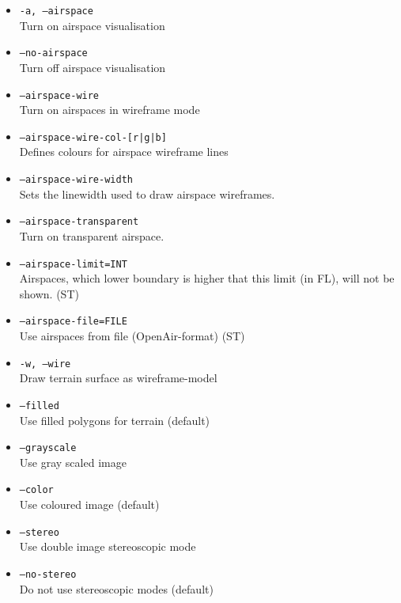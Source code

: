 \begin{itemize}
\item \texttt{-a, --airspace} \\
Turn on airspace visualisation

\item \texttt{--no-airspace} \\
Turn off airspace visualisation

\item \texttt{--airspace-wire} \\
Turn on airspaces in wireframe mode

\item \texttt{--airspace-wire-col-[r|g|b]} \\
Defines colours for airspace wireframe lines

\item \texttt{--airspace-wire-width}\\
Sets the linewidth used to draw airspace wireframes.

\item \texttt{--airspace-transparent} \\
Turn on transparent airspace.

\item \texttt{--airspace-limit=INT} \\
Airspaces, which lower boundary is higher that this limit (in FL), will not be shown. (ST)

\item \texttt{--airspace-file=FILE} \\
Use airspaces from file (OpenAir\texttrademark -format) (ST)

\item \texttt{-w, --wire} \\
Draw terrain surface as wireframe-model

\item \texttt{--filled} \\
Use filled polygons for terrain (default)

\item \texttt{--grayscale} \\
Use gray scaled image

\item \texttt{--color} \\
Use coloured image (default)

\item \texttt{--stereo} \\
Use double image stereoscopic mode

\item \texttt{--no-stereo} \\
Do not use stereoscopic modes (default)


\end{itemize}
